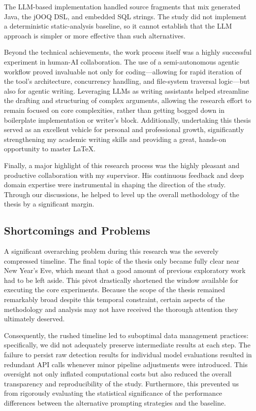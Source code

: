 The LLM-based implementation handled source fragments that mix generated Java, the jOOQ DSL, and embedded SQL strings. The study did not implement a deterministic static-analysis baseline, so it cannot establish that the LLM approach is simpler or more effective than such alternatives.

Beyond the technical achievements, the work process itself was a highly successful experiment in human-AI collaboration. The use of a semi-autonomous agentic workflow proved invaluable not only for coding—allowing for rapid iteration of the tool's architecture, concurrency handling, and file-system traversal logic—but also for agentic writing. Leveraging LLMs as writing assistants helped streamline the drafting and structuring of complex arguments, allowing the research effort to remain focused on core complexities, rather than getting bogged down in boilerplate implementation or writer's block. Additionally, undertaking this thesis served as an excellent vehicle for personal and professional growth, significantly strengthening my academic writing skills and providing a great, hands-on opportunity to master LaTeX.

Finally, a major highlight of this research process was the highly pleasant and productive collaboration with my supervisor. His continuous feedback and deep domain expertise were instrumental in shaping the direction of the study. Through our discussions, he helped to level up the overall methodology of the thesis by a significant margin.

\subsection{Shortcomings and Problems}

A significant overarching problem during this research was the severely compressed timeline. The final topic of the thesis only became fully clear near New Year's Eve, which meant that a good amount of previous exploratory work had to be left aside. This pivot drastically shortened the window available for executing the core experiments. Because the scope of the thesis remained remarkably broad despite this temporal constraint, certain aspects of the methodology and analysis may not have received the thorough attention they ultimately deserved.

Consequently, the rushed timeline led to suboptimal data management practices: specifically, we did not adequately preserve intermediate results at each step. The failure to persist raw detection results for individual model evaluations resulted in redundant API calls whenever minor pipeline adjustments were introduced. This oversight not only inflated computational costs but also reduced the overall transparency and reproducibility of the study. Furthermore, this prevented us from rigorously evaluating the statistical significance of the performance differences between the alternative prompting strategies and the baseline.

